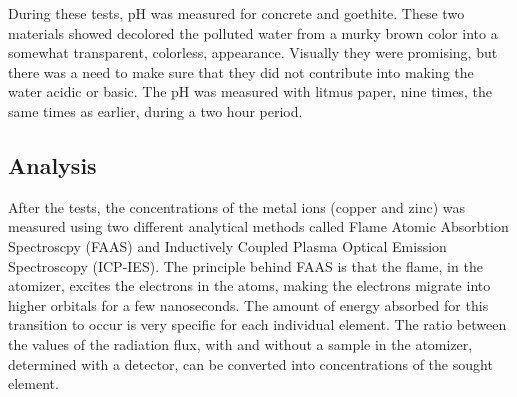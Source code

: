 During these tests, pH was measured for concrete and goethite. These two materials showed decolored the polluted water from a murky brown color into a somewhat transparent, colorless, appearance.  Visually they were promising, but there was a need to make sure that they did not contribute into making the water acidic or basic. The pH was measured with litmus paper, nine times, the same times as earlier, during a two hour period.

\subsection{Analysis}
After the tests, the concentrations of the metal ions (copper and zinc) was measured using two different analytical methods called Flame Atomic Absorbtion Spectroscpy (FAAS) and Inductively Coupled Plasma Optical Emission Spectroscopy (ICP-IES).
The principle behind FAAS is that the flame, in the atomizer, excites the electrons in the atoms, making the electrons migrate into higher orbitals for a few nanoseconds. The amount of energy absorbed for this transition to occur is very specific for each individual element. The ratio between the values of the radiation flux, with and without a sample in the atomizer, determined with a detector, can be converted into concentrations of the sought element.  










